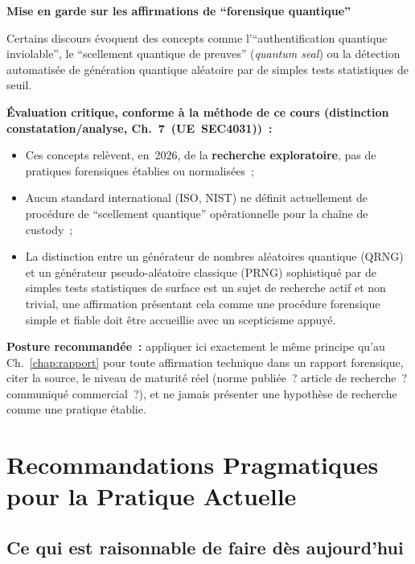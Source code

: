 \begin{boxalert}
\textbf{Mise en garde sur les affirmations de ``forensique quantique''}

Certains discours évoquent des concepts comme l'``authentification
quantique inviolable'', le ``scellement quantique de preuves''
(\textit{quantum seal}) ou la détection automatisée de génération
quantique aléatoire par de simples tests statistiques de seuil.

\textbf{Évaluation critique, conforme à la méthode de ce cours
(distinction constatation/analyse, Ch.~7~(UE~SEC4031))~:}
\begin{itemize}
    \item Ces concepts relèvent, en~2026, de la \textbf{recherche
          exploratoire}, pas de pratiques forensiques établies
          ou normalisées~;
    \item Aucun standard international (ISO, NIST) ne définit
          actuellement de procédure de ``scellement quantique''
          opérationnelle pour la chaîne de custody~;
    \item La distinction entre un générateur de nombres aléatoires
          quantique (QRNG) et un générateur pseudo-aléatoire
          classique (PRNG) sophistiqué par de simples tests
          statistiques de surface est un sujet de recherche actif
          et non trivial, une affirmation présentant cela comme
          une procédure forensique simple et fiable doit être
          accueillie avec un scepticisme appuyé.
\end{itemize}
\textbf{Posture recommandée~:} appliquer ici exactement le même
principe qu'au Ch.~\ref{chap:rapport} pour toute affirmation
technique dans un rapport forensique, citer la source, le
niveau de maturité réel (norme publiée~? article de recherche~?
communiqué commercial~?), et ne jamais présenter une hypothèse
de recherche comme une pratique établie.
\end{boxalert}

\section{Recommandations Pragmatiques pour la Pratique Actuelle}
\label{sec:recommandations-pratiques}

\subsection{Ce qui est raisonnable de faire dès aujourd'hui}

